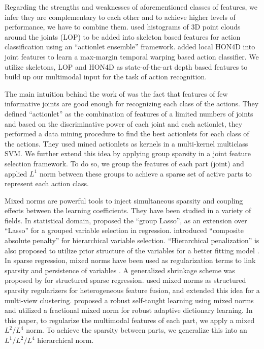 \documentclass[9pt,technote,compsoc]{IEEEtran}
\begin{document}
Regarding the strengths and weaknesses of aforementioned classes of features, we infer they are complementary to each other and to achieve higher levels of performance, we have to combine them. \cite{actionletPAMI} used histograms of 3D point clouds around the joints (LOP) to be added into skeleton based features for action classification using an ``actionlet ensemble'' framework. \cite{MMTW} added local HON4D \cite{HON4D} into joint features to learn a max\--margin temporal warping based action classifier. We utilize skeletons, LOP and HON4D as state-of-the-art depth based features to build up our multimodal input for the task of action recognition.

The main intuition behind the work of \cite{actionletPAMI} was the fact that features of few informative joints are good enough for recognizing each class of the actions. They defined ``actionlet'' as the combination of features of a limited numbers of joints and based on the discriminative power of each joint and each actionlet, they performed a data mining procedure to find the best actionlets for each class of the actions. They used mined actionlets as kernels in a multi-kernel multiclass SVM. We further extend this idea by applying group sparsity in a joint feature selection framework. To do so, we group the features of each part (joint) and applied $L^1$ norm between these groups to achieve a sparse set of active parts to represent each action class.

Mixed norms are powerful tools to inject simultaneous sparsity and coupling effects between the learning coefficients. They have been studied in a variety of fields. In statistical domain, \cite{groupLasso} proposed the ``group Lasso'', as an extension over ``Lasso'' \cite{Lasso} for a grouped variable selection in regression. \cite{zhao2009composite} introduced ``composite absolute penalty'' for hierarchical variable selection. ``Hierarchical penalization'' is also proposed to utilize prior structure of the variables for a better fitting model \cite{NIPS2007_3338}. In sparse regression, mixed norms have been used as regularization terms to link sparsity and persistence of variables \cite{Kowalski2009303}. A generalized shrinkage scheme was proposed by \cite{kowalski:inria-00369577} for structured sparse regression. \cite{6619242} used mixed norms as structured sparsity regularizers for heterogeneous feature fusion, and \cite{icml2013_wang13c} extended this idea for a multi-view clustering. \cite{wang2013robust} proposed a robust self-taught learning using mixed norms and \cite{Wang_2013_ICCV} utilized a fractional mixed norm for robust adaptive dictionary learning. In this paper, to regularize the multimodal features of each part, we apply a mixed $L^2/L^4$ norm. To achieve the sparsity between parts, we generalize this into an $L^1/L^2/L^4$ hierarchical norm.
\end{document}
